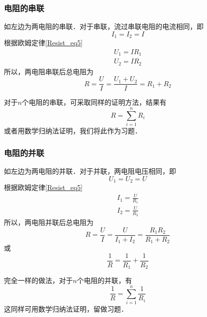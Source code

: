 
\subsubsection{电阻的串联}
如左边为两电阻的串联．对于串联，流过串联电阻的电流相同，即
\begin{equation}
I_1=I_2=I
\end{equation}
根据欧姆定律\autoref{Resist_eq5}~
\begin{equation}
\begin{aligned}
U_1=IR_1\\
U_2=IR_2
\end{aligned}
\end{equation}
所以，两电阻串联后总电阻为
\begin{equation}
R = \frac{U}{I}=\frac{U_1+U_2}{I} = {R_1 + R_2}
\end{equation}

对于$n$个电阻的串联，可采取同样的证明方法，结果有
\begin{equation}
R=\sum_{i=1}^{n}R_i
\end{equation}
或者用数学归纳法证明，我们将此作为习题．
\subsubsection{电阻的并联}
如左边为两电阻的并联．对于并联，两电阻电压相同，即
\begin{equation}
U_1=U_2=U
\end{equation}
根据欧姆定律\autoref{Resist_eq5}~
\begin{equation}
\begin{aligned}
I_1=\frac{U}{R_1}\\
I_2=\frac{U}{R_2}
\end{aligned}
\end{equation}
所以，两电阻并联后总电阻为
\begin{equation}
R = \frac{U}{I}=\frac{U}{I_1+I_2} =\frac{R_1R_2} {R_1 + R_2}
\end{equation}
或
\begin{equation}
\frac{1}{R} = \frac{1} {R_1}+\frac{1}{R_2}
\end{equation}

完全一样的做法，对于$n$个电阻的并联，有
\begin{equation}
\frac{1}{R}=\sum_{i=1}^{n}\frac{1}{R_i}
\end{equation}
这同样可用数学归纳法证明，留做习题．
